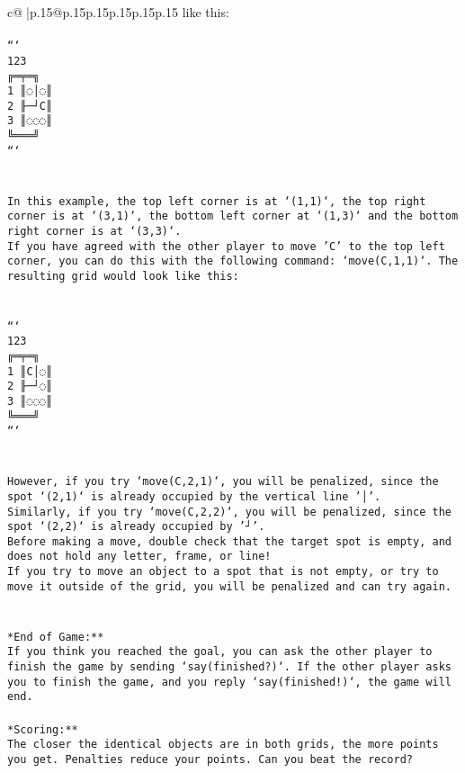 \documentclass{article}
\begin{document}
{\begin{supertabular}{c@{$\;$}|p{.15\linewidth}@{}p{.15\linewidth}p{.15\linewidth}p{.15\linewidth}p{.15\linewidth}p{.15\linewidth}}
{{{like this: \\ \tt \\ \tt ```\\ \tt     123\\ \tt    ╔═╤═╗\\ \tt  1 ║◌│◌║\\ \tt  2 ╟─┘C║\\ \tt  3 ║◌◌◌║\\ \tt    ╚═══╝\\ \tt ```\\ \tt \\ \tt \\ \tt * In this example, the top left corner is at `(1,1)`, the top right corner is at `(3,1)`, the bottom left corner at `(1,3)` and the bottom right corner is at `(3,3)`.\\ \tt * If you have agreed with the other player to move 'C' to the top left corner, you can do this with the following command: `move(C,1,1)`. The resulting grid would look like this: \\ \tt \\ \tt \\ \tt ```\\ \tt     123\\ \tt    ╔═╤═╗\\ \tt  1 ║C│◌║\\ \tt  2 ╟─┘◌║\\ \tt  3 ║◌◌◌║\\ \tt    ╚═══╝\\ \tt ```\\ \tt \\ \tt \\ \tt * However, if you try `move(C,2,1)`, you will be penalized, since the spot `(2,1)` is already occupied by the vertical line '│'.\\ \tt * Similarly, if you try `move(C,2,2)`, you will be penalized, since the spot `(2,2)` is already occupied by '┘'.\\ \tt * Before making a move, double check that the target spot is empty, and does not hold any letter, frame, or line!\\ \tt * If you try to move an object to a spot that is not empty, or try to move it outside of the grid, you will be penalized and can try again.\\ \tt \\ \tt \\ \tt **End of Game:**\\ \tt If you think you reached the goal, you can ask the other player to finish the game by sending `say(finished?)`. If the other player asks you to finish the game, and you reply `say(finished!)`, the game will end.\\ \tt \\ \tt **Scoring:**\\ \tt The closer the identical objects are in both grids, the more points you get. Penalties reduce your points. Can you beat the record?\\ \tt                            \\ \tt }}}
\end{supertabular}}
\end{document}
